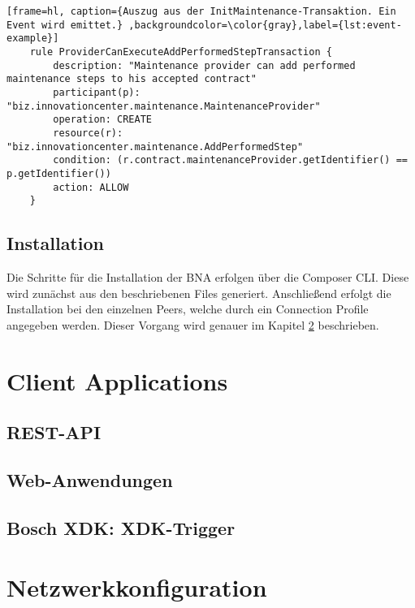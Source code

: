 \begin{lstfloat}
\begin{lstlisting}[frame=hl, caption={Auszug aus der InitMaintenance-Transaktion. Ein Event wird emittet.} ,backgroundcolor=\color{gray},label={lst:event-example}]
    rule ProviderCanExecuteAddPerformedStepTransaction {
        description: "Maintenance provider can add performed maintenance steps to his accepted contract"
        participant(p): "biz.innovationcenter.maintenance.MaintenanceProvider"
        operation: CREATE
        resource(r): "biz.innovationcenter.maintenance.AddPerformedStep"
        condition: (r.contract.maintenanceProvider.getIdentifier() == p.getIdentifier())
        action: ALLOW
    }
\end{lstlisting} 
\end{lstfloat}

\subsection{Installation}
Die Schritte für die Installation der BNA erfolgen über die Composer CLI. Diese wird zunächst aus den beschriebenen Files generiert. Anschließend erfolgt die Installation bei den einzelnen Peers, welche durch ein Connection Profile angegeben werden. Dieser Vorgang wird genauer im Kapitel \ref{sec:network-config} beschrieben.  

\section{Client Applications}

\subsection{REST-API}
\label{subsec:REST}

\subsection{Web-Anwendungen}

\subsection{Bosch XDK: XDK-Trigger}

\section{Netzwerkkonfiguration}
\label{sec:network-config}

